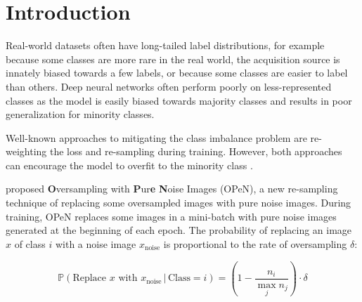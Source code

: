 \section{Introduction}

Real-world datasets often have long-tailed label distributions, for example because some classes are more rare in the real world, the acquisition source is innately biased towards a few labels, or because some classes are easier to label than others. Deep neural networks often perform poorly on less-represented classes as the model is easily biased towards majority classes and results in poor generalization for minority classes.

Well-known approaches to mitigating the class imbalance problem are re-weighting the loss and re-sampling during training. However, both approaches can encourage the model to overfit to the minority class \citep{PureNoise, M2m, Buda}.





\citet{PureNoise} proposed \textbf{O}versampling with \textbf{P}ur\textbf{e} \textbf{N}oise Images (OPeN), a new re-sampling technique of replacing some oversampled images with pure noise images. During training, OPeN replaces some images in a mini-batch with pure noise images generated at the beginning of each epoch. The probability of replacing an image $x$ of class $i$ with a noise image $x_{\text{noise}}$ is proportional to the rate of oversampling $\delta$:

\begin{equation}
\mathbb{P}(\text{Replace }x\text{ with }x_{\text{noise}} \,|\, \text{Class}=i) = \left(1 - \frac{n_i}{\max_j n_j}\right) \cdot \delta
\end{equation}

